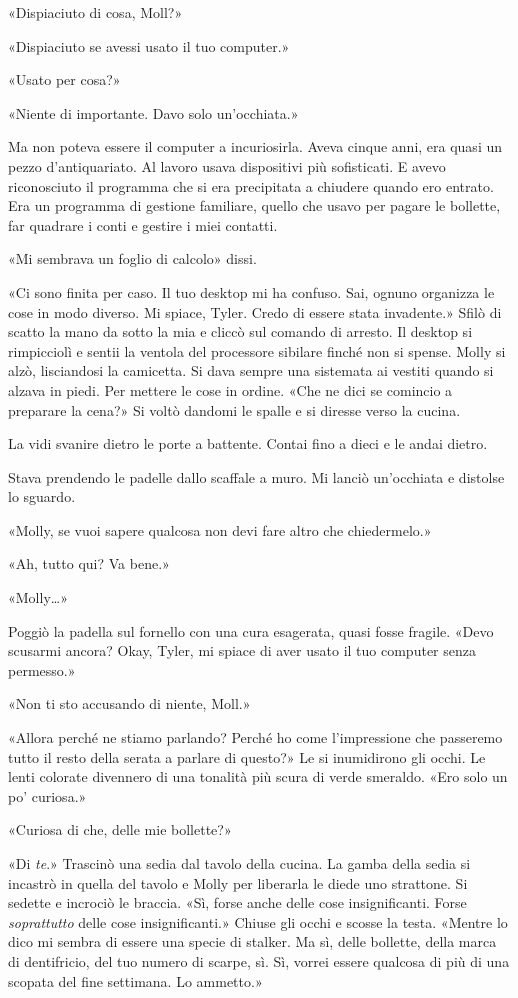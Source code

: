 «Dispiaciuto di cosa, Moll?»

«Dispiaciuto se avessi usato il tuo computer.»

«Usato per cosa?»

«Niente di importante. Davo solo un'occhiata.»

Ma non poteva essere il computer a incuriosirla. Aveva cinque anni, era
quasi un pezzo d'antiquariato. Al lavoro usava dispositivi più
sofisticati. E avevo riconosciuto il programma che si era precipitata a
chiudere quando ero entrato. Era un programma di gestione familiare,
quello che usavo per pagare le bollette, far quadrare i conti e gestire
i miei contatti.

«Mi sembrava un foglio di calcolo» dissi.

«Ci sono finita per caso. Il tuo desktop mi ha confuso. Sai, ognuno
organizza le cose in modo diverso. Mi spiace, Tyler. Credo di essere
stata invadente.» Sfilò di scatto la mano da sotto la mia e cliccò sul
comando di arresto. Il desktop si rimpicciolì e sentii la ventola del
processore sibilare finché non si spense. Molly si alzò, lisciandosi la
camicetta. Si dava sempre una sistemata ai vestiti quando si alzava in
piedi. Per mettere le cose in ordine. «Che ne dici se comincio a
preparare la cena?» Si voltò dandomi le spalle e si diresse verso la
cucina.

La vidi svanire dietro le porte a battente. Contai fino a dieci e le
andai dietro.

Stava prendendo le padelle dallo scaffale a muro. Mi lanciò un'occhiata
e distolse lo sguardo.

«Molly, se vuoi sapere qualcosa non devi fare altro che chiedermelo.»

«Ah, tutto qui? Va bene.»

«Molly\ldots»

Poggiò la padella sul fornello con una cura esagerata, quasi fosse
fragile. «Devo scusarmi ancora? Okay, Tyler, mi spiace di aver usato il
tuo computer senza permesso.»

«Non ti sto accusando di niente, Moll.»

«Allora perché ne stiamo parlando? Perché ho come l'impressione che
passeremo tutto il resto della serata a parlare di questo?» Le si
inumidirono gli occhi. Le lenti colorate divennero di una tonalità più
scura di verde smeraldo. «Ero solo un po' curiosa.»

«Curiosa di che, delle mie bollette?»

«Di \emph{te}.» Trascinò una sedia dal tavolo della cucina. La gamba
della sedia si incastrò in quella del tavolo e Molly per liberarla le
diede uno strattone. Si sedette e incrociò le braccia. «Sì, forse anche
delle cose insignificanti. Forse \emph{soprattutto} delle cose
insignificanti.» Chiuse gli occhi e scosse la testa. «Mentre lo dico mi
sembra di essere una specie di stalker. Ma sì, delle bollette, della
marca di dentifricio, del tuo numero di scarpe, sì. Sì, vorrei essere
qualcosa di più di una scopata del fine settimana. Lo ammetto.»


